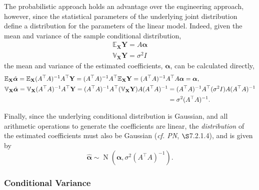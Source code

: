 \documentclass[12pt, twoside, draft]{article}
\begin{document}
The probabilistic approach holds an advantage over the engineering approach, however, since the statistical parameters of the underlying joint distribution define a distribution for the parameters of the linear model.  Indeed, given the mean and variance of the sample conditional distribution,
\begin{align}
\mathbb{E}_{\mathbf{X}} \mathbf{Y} = A \boldsymbol{\alpha} \\
\mathbb{V}_{\mathbf{X}} \mathbf{Y} = \sigma^2 I
\end{align}
the mean and variance of the estimated coefficients, $\boldsymbol{\alpha}$, can be calculated directly,
\begin{align}
&\mathbb{E}_{\mathbf{X}} \hat{\boldsymbol{\alpha}} =  \mathbb{E}_{\mathbf{X}} (A^\top A)^{-1} A^\top \mathbf{Y} = (A^\top A)^{-1} A^\top \mathbb{E}_{\mathbf{X}} \mathbf{Y} = (A^\top A)^{-1} A^\top A \boldsymbol{\alpha} = \boldsymbol{\alpha}, \\
&\mathbb{V}_{\mathbf{X}} \hat{\boldsymbol{\alpha}} = \mathbb{V}_{\mathbf{X}} (A^\top A)^{-1} A^\top \mathbf{Y} = (A^\top A)^{-1} A^\top (\mathbb{V}_{\mathbf{X}} \mathbf{Y} ) A (A^\top A)^{-1} = (A^\top A)^{-1} A^\top (\sigma^2 I) A (A^\top A)^{-1} \notag \\
&\hspace{260pt}= \sigma^2 (A^\top A)^{-1}.
\end{align}

Finally, since the underlying conditional distribution is Gaussian, and all arithmetic operations to generate the coefficients are linear, the \textit{distribution} of the estimated coefficients must also be Gaussian (\textit{cf. PN}, $\S$7.2.1.4), and is given by 
\begin{equation}\label{eq:linear_parameters_distributions}
\hat{\boldsymbol{\alpha}} \sim \operatorname{N} \left( \boldsymbol{\alpha}, \sigma^2 (A^\top A)^{-1} \right).
\end{equation}


\subsubsection{Conditional Variance}
\end{document}
